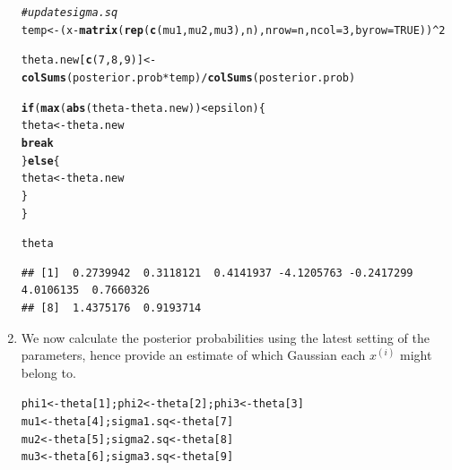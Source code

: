 \documentclass[11pt, a4paper]{article}\usepackage[]{graphicx}\usepackage[]{xcolor}
\makeatletter
\newcommand{\hlnum}[1]{\textcolor[rgb]{0.686,0.059,0.569}{#1}}%
\newcommand{\hlcom}[1]{\textcolor[rgb]{0.678,0.584,0.686}{\textit{#1}}}%
\newcommand{\hlopt}[1]{\textcolor[rgb]{0,0,0}{#1}}%
\newcommand{\hldef}[1]{\textcolor[rgb]{0.345,0.345,0.345}{#1}}%
\newcommand{\hlkwa}[1]{\textcolor[rgb]{0.161,0.373,0.58}{\textbf{#1}}}%
\newcommand{\hlkwb}[1]{\textcolor[rgb]{0.69,0.353,0.396}{#1}}%
\newcommand{\hlkwc}[1]{\textcolor[rgb]{0.333,0.667,0.333}{#1}}%
\newcommand{\hlkwd}[1]{\textcolor[rgb]{0.737,0.353,0.396}{\textbf{#1}}}%
\newenvironment{kframe}{%
 \def\at@end@of@kframe{}%
 \ifinner\ifhmode%
  \def\at@end@of@kframe{\end{minipage}}%
  \begin{minipage}{\columnwidth}%
 \fi\fi%
 \def\FrameCommand##1{\hskip\@totalleftmargin \hskip-\fboxsep
 \colorbox{shadecolor}{##1}\hskip-\fboxsep
     \hskip-\linewidth \hskip-\@totalleftmargin \hskip\columnwidth}%
 \MakeFramed {\advance\hsize-\width
   \@totalleftmargin\z@ \linewidth\hsize
   \@setminipage}}%
 {\par\unskip\endMakeFramed%
 \at@end@of@kframe}
\newenvironment{knitrout}{}{} %
\makeatother
\begin{document}
\begin{enumerate}
\begin{knitrout}
\begin{kframe}
\begin{alltt}
  \hlcom{# update sigma.sq}
  \hldef{temp} \hlkwb{<-} \hldef{(x} \hlopt{-} \hlkwd{matrix}\hldef{(}\hlkwd{rep}\hldef{(}\hlkwd{c}\hldef{(mu1, mu2, mu3), n),} \hlkwc{nrow} \hldef{= n,} \hlkwc{ncol} \hldef{=} \hlnum{3}\hldef{,} \hlkwc{byrow} \hldef{=} \hlnum{TRUE}\hldef{))}\hlopt{^}\hlnum{2}

  \hldef{theta.new[}\hlkwd{c}\hldef{(}\hlnum{7}\hldef{,} \hlnum{8}\hldef{,} \hlnum{9}\hldef{)]} \hlkwb{<-} \hlkwd{colSums}\hldef{(posterior.prob} \hlopt{*} \hldef{temp)} \hlopt{/} \hlkwd{colSums}\hldef{(posterior.prob)}

  \hlkwa{if}\hldef{(}\hlkwd{max}\hldef{(}\hlkwd{abs}\hldef{(theta} \hlopt{-} \hldef{theta.new))} \hlopt{<} \hldef{epsilon)\{}
    \hldef{theta} \hlkwb{<-} \hldef{theta.new}
    \hlkwa{break}
  \hldef{\}}\hlkwa{else}\hldef{\{}
    \hldef{theta} \hlkwb{<-} \hldef{theta.new}
  \hldef{\}}
\hldef{\}}
\end{alltt}
\end{kframe}
\end{knitrout}

\begin{knitrout}
\color{fgcolor}\begin{kframe}
\begin{alltt}
\hldef{theta}
\end{alltt}
\begin{verbatim}
## [1]  0.2739942  0.3118121  0.4141937 -4.1205763 -0.2417299  4.0106135  0.7660326
## [8]  1.4375176  0.9193714
\end{verbatim}
\end{kframe}
\end{knitrout}

\newpage

\item[\scalebox{2.0}{\twemoji{keycap: 3}}] \hspace{0.2cm} We now calculate the posterior probabilities using the latest setting of the parameters, hence provide an estimate of which Gaussian each $x^{(i)}$ might belong to.

\begin{knitrout}
\color{fgcolor}\begin{kframe}
\begin{alltt}
\hldef{phi1} \hlkwb{<-} \hldef{theta[}\hlnum{1}\hldef{]; phi2} \hlkwb{<-} \hldef{theta[}\hlnum{2}\hldef{]; phi3} \hlkwb{<-} \hldef{theta[}\hlnum{3}\hldef{]}
\hldef{mu1} \hlkwb{<-} \hldef{theta[}\hlnum{4}\hldef{]; sigma1.sq} \hlkwb{<-} \hldef{theta[}\hlnum{7}\hldef{]}
\hldef{mu2} \hlkwb{<-} \hldef{theta[}\hlnum{5}\hldef{]; sigma2.sq} \hlkwb{<-} \hldef{theta[}\hlnum{8}\hldef{]}
\hldef{mu3} \hlkwb{<-} \hldef{theta[}\hlnum{6}\hldef{]; sigma3.sq} \hlkwb{<-} \hldef{theta[}\hlnum{9}\hldef{]}
\end{alltt}
\end{kframe}
\end{knitrout}


\end{enumerate}
\end{document}
